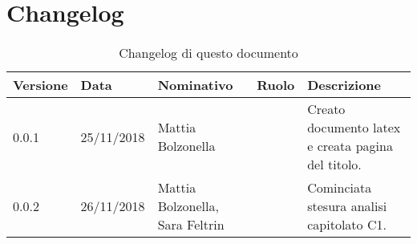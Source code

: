 \section{Changelog}
\begin{table}[tbph]
        \centering
        \begin{tabularx}{\textwidth}{|l|l|l|l|X|}
                \hline
                \textbf{Versione} & \textbf{Data} & \textbf{Nominativo}  & \textbf{Ruolo} & \textbf{Descrizione}\\
              \hline \hline
              0.0.1 & 25/11/2018 & Mattia Bolzonella & & Creato documento latex e creata pagina del titolo. \\
              \hline
              0.0.2 & 26/11/2018 & Mattia Bolzonella, Sara Feltrin & &Cominciata stesura analisi capitolato C1.\\
              \hline
        \end{tabularx}
        \caption{Changelog di questo documento}
\end{table}